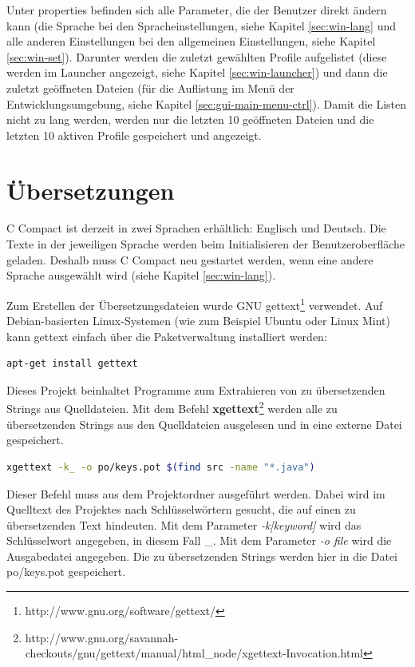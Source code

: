 Unter \glqq{}properties\grqq{} befinden sich alle Parameter, die der Benutzer direkt ändern kann (die Sprache bei den Spracheinstellungen, siehe Kapitel \ref{sec:win-lang} und alle anderen Einstellungen bei den allgemeinen Einstellungen, siehe Kapitel \ref{sec:win-set}). Darunter werden die zuletzt gewählten Profile aufgelistet (diese werden im Launcher angezeigt, siehe Kapitel \ref{sec:win-launcher}) und dann die zuletzt geöffneten Dateien (für die Auflistung im Menü der Entwicklungsumgebung, siehe Kapitel \ref{sec:gui-main-menu-ctrl}). Damit die Listen nicht zu lang werden, werden nur die letzten 10 geöffneten Dateien und die letzten 10 aktiven Profile gespeichert und angezeigt.

\section{Übersetzungen}
\label{sec:lang}
C Compact ist derzeit in zwei Sprachen erhältlich: Englisch und Deutsch. Die Texte in der jeweiligen Sprache werden beim Initialisieren der Benutzeroberfläche geladen. Deshalb muss C Compact neu gestartet werden, wenn eine andere Sprache ausgewählt wird (siehe Kapitel \ref{sec:win-lang}).

Zum Erstellen der Übersetzungsdateien wurde GNU gettext\footnote{http://www.gnu.org/software/gettext/} verwendet. Auf Debian-basierten Linux-Systemen (wie zum Beispiel Ubuntu oder Linux Mint) kann gettext einfach über die Paketverwaltung installiert werden:
\begin{lstlisting}[language=sh]
apt-get install gettext
\end{lstlisting}

Dieses Projekt beinhaltet Programme zum Extrahieren von zu übersetzenden Strings aus Quelldateien. Mit dem Befehl \textbf{xgettext}\footnote{http://www.gnu.org/savannah-checkouts/gnu/gettext/manual/html\_node/xgettext-Invocation.html} werden alle zu übersetzenden Strings aus den Quelldateien ausgelesen und in eine externe Datei gespeichert.
\begin{lstlisting}[language=sh]
xgettext -k_ -o po/keys.pot $(find src -name "*.java")
\end{lstlisting}
Dieser Befehl muss aus dem Projektordner ausgeführt werden. Dabei wird im Quelltext des Projektes nach Schlüsselwörtern gesucht, die auf einen zu übersetzenden Text hindeuten. Mit dem Parameter \emph{-k[keyword]} wird das Schlüsselwort angegeben, in diesem Fall \glqq{}\_\grqq{}. Mit dem Parameter \emph{-o file} wird die Ausgabedatei angegeben. Die zu übersetzenden Strings werden hier in die Datei po/keys.pot gespeichert.

